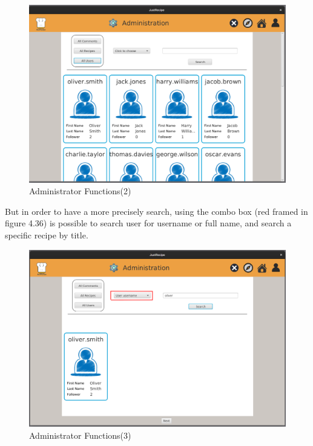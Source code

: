 \documentclass[a4paper]{report}
\begin{document}
\begin{figure}[htpb]
	\centering
	\includegraphics[scale=0.37]{img/user_manual/administratorFunction2.png}
	\caption{Administrator Functions(2)}
\end{figure}

\noindent But in order to have a more precisely search, using the combo box (red framed in figure 4.36) is possible to search user for username or full name, and search a specific recipe by title.
\begin{figure}[htpb]
	\centering
	\includegraphics[scale=0.37]{img/user_manual/administratorFunction3.png}
	\caption{Administrator Functions(3)}
\end{figure}
\end{document}
